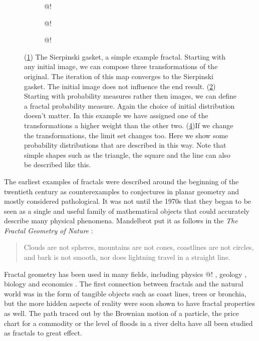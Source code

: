 \documentclass[10pt]{article}
\theoremstyle{definition}
\begin{document}
 
\begin{figure}[h!]
  \centering
  \begin{subfigure}[b]{\textwidth}@!
    \label{fig:sierpinski}
  \end{subfigure}
  
  \begin{subfigure}[b]{\textwidth}@!
    \label{fig:sierpinski-measure}
  \end{subfigure}
  
  \begin{subfigure}[b]{\textwidth}@!
    \label{fig:ifs-measure}
  \end{subfigure}
  \caption{(\ref{fig:sierpinski}) The Sierpinski gasket, a simple example fractal. Starting with any initial image, we can compose three transformations of the original. The iteration of this map converges to the Sierpinski gasket. The initial image does not influence the end result. (\ref{fig:sierpinski-measure}) Starting with probability measures rather then images, we can define a fractal probability measure. Again the choice of initial distribution doesn't matter. In this example we have assigned one of the transformations a higher weight than the other two. (\ref{fig:ifs-measure})If we change the transformations, the limit set changes too. Here we show some probability distributions that are described in this way. Note that simple shapes such as the triangle, the square and the line can also be described like this.}  
\end{figure}

The earliest examples of fractals were described around the beginning of the twentieth century as counterexamples to conjectures in planar geometry and mostly considered pathological. It was not until the 1970s that they began to be seen as a single and useful family of mathematical objects that could accurately describe many physical phenomena. Mandelbrot put it as follows in the \emph{The Fractal Geometry of Nature} \cite{mandelbrot1982fractal}:

\begin{quotation}
\small
\noindent Clouds are not spheres, mountains are not cones, coastlines are not circles, and bark is not smooth, nor does lightning travel in a straight line.
\end{quotation}

Fractal geometry has been used in many fields, including physics @! \cite{}, geology \cite{cheng1997multifractal}, biology \cite{goldberger1992fractal} and economics \cite{turiel2003multifractal}. The first connection between fractals and the natural world was in the form of tangible objects such as coast lines, trees or bronchia, but the more hidden aspects of reality were soon shown to have fractal properties as well. The path traced out by the Brownian motion of a particle, the price chart for a commodity or the level of floods in a river delta have all been studied as fractals to great effect.
\end{document}
